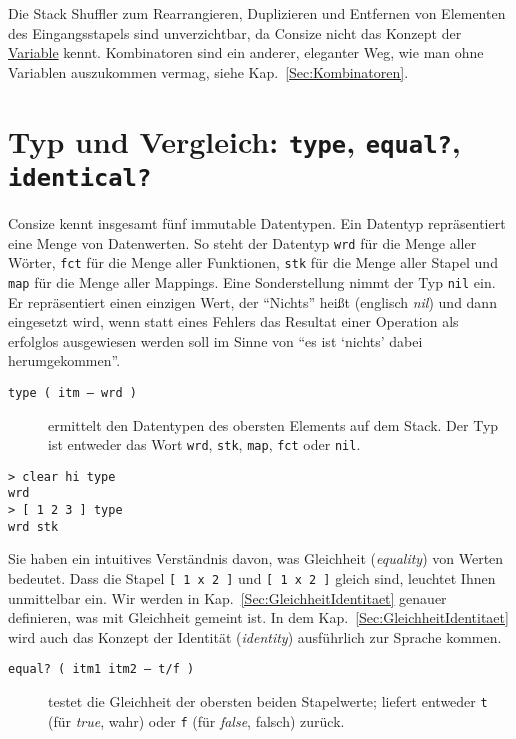 Die Stack Shuffler zum Rearrangieren, Duplizieren und Entfernen von Elementen des Eingangsstapels sind unverzichtbar, da Consize nicht das Konzept der \href{http://de.wikipedia.org/wiki/Variable_(Programmierung)}{Variable} kennt. Kombinatoren sind ein anderer, eleganter Weg, wie man ohne Variablen auszukommen vermag, siehe Kap.~\ref{Sec:Kombinatoren}.


\section{Typ und Vergleich: \texttt{type}, \texttt{equal?}, \texttt{identical?}}

Consize kennt insgesamt fünf immutable Datentypen. Ein Datentyp repräsentiert eine Menge von Datenwerten. So steht der Datentyp \verb|wrd| für die Menge aller Wörter, \verb|fct| für die Menge aller Funktionen, \verb|stk| für die Menge aller Stapel und \verb|map| für die Menge aller Mappings. Eine Sonderstellung nimmt der Typ \verb|nil| ein. Er repräsentiert einen einzigen Wert, der "`Nichts"' heißt (englisch \emph{nil}) und dann eingesetzt wird, wenn statt eines Fehlers das Resultat einer Operation als erfolglos ausgewiesen werden soll im Sinne von "`es ist `nichts' dabei herumgekommen"'.

\begin{description}
\item[\texttt{type ( itm -- wrd )}] ermittelt den Datentypen des obersten Elements auf dem Stack. Der Typ ist entweder das Wort \verb|wrd|, \verb|stk|, \verb|map|, \verb|fct| oder \verb|nil|.
\end{description}

\begin{verbatim}
> clear hi type
wrd
> [ 1 2 3 ] type
wrd stk
\end{verbatim}

Sie haben ein intuitives Verständnis davon, was Gleichheit (\emph{equality}) von Werten bedeutet. Dass die Stapel \verb|[ 1 x 2 ]| und \verb|[ 1 x 2 ]| gleich sind, leuchtet Ihnen unmittelbar ein. Wir werden in Kap.~\ref{Sec:GleichheitIdentitaet} genauer definieren, was mit Gleichheit gemeint ist. In dem Kap.~\ref{Sec:GleichheitIdentitaet} wird auch das Konzept der Identität (\emph{identity}) ausführlich zur Sprache kommen. 

\begin{description}
\item[\texttt{equal? ( itm1 itm2 -- t/f )}] testet die Gleichheit der obersten beiden Stapelwerte; liefert entweder \verb|t| (für \emph{true}, wahr) oder \verb|f| (für \emph{false}, falsch) zurück.
\end{description}

